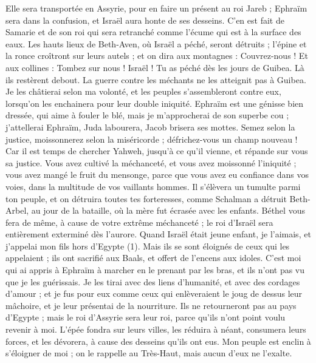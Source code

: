 \begin{multicols}{2}
Elle sera transportée en Assyrie, pour en faire un présent au roi Jareb ; Ephraïm sera dans la confusion, et Israël aura honte de ses desseins.
C’en est fait de Samarie et de son roi qui sera retranché comme l'écume qui est à la surface des eaux.
Les hauts lieux de Beth-Aven, où Israël a péché, seront détruits ; l'épine et la ronce croîtront sur leurs autels ; et on dira aux montagnes : Couvrez-nous ! Et aux collines : Tombez sur nous !
Israël ! Tu as péché dès les jours de Guibea. Là ils restèrent debout. La guerre contre les méchants ne les atteignit pas à Guibea.
Je les châtierai selon ma volonté, et les peuples s’assembleront contre eux, lorsqu’on les enchainera pour leur double iniquité.
Ephraïm est une génisse bien dressée, qui aime à fouler le blé, mais je m’approcherai de son superbe cou ; j’attellerai Ephraïm, Juda labourera, Jacob brisera ses mottes.
Semez selon la justice, moissonnerez selon la miséricorde ; défrichez-vous un champ nouveau ! Car il est temps de chercher Yahweh, jusqu'à ce qu'il vienne, et répande sur vous sa justice.
Vous avez cultivé la méchanceté, et vous avez moissonné l’iniquité ; vous avez mangé le fruit du mensonge, parce que vous avez eu confiance dans vos voies, dans la multitude de vos vaillants hommes.
Il s'élèvera un tumulte parmi ton peuple, et on détruira toutes tes forteresses, comme Schalman a détruit Beth-Arbel, au jour de la bataille, où la mère fut écrasée avec les enfants.
Béthel vous fera de même, à cause de votre extrême méchanceté ; le roi d'Israël sera entièrement exterminé dès l’aurore.
\VerseOne{}Quand Israël était jeune enfant, je l'aimais, et j'appelai mon fils hors d'Egypte (1).
Mais ils se sont éloignés de ceux qui les appelaient ; ils ont sacrifié aux Baals, et offert de l’encens aux idoles.
C’est moi qui ai appris à Ephraïm à marcher en le prenant par les bras, et ils n'ont pas vu que je les guérissais.
Je les tirai avec des liens d'humanité, et avec des cordages d'amour ; et je fus pour eux comme ceux qui enlèveraient le joug de dessus leur mâchoire, et je leur présentai de la nourriture.
Ils ne retourneront pas au pays d'Egypte ; mais le roi d'Assyrie sera leur roi, parce qu'ils n'ont point voulu revenir à moi.
L'épée fondra sur leurs villes, les réduira à néant, consumera leurs forces, et les dévorera, à cause des desseins qu’ils ont eus.
Mon peuple est enclin à s’éloigner de moi ; on le rappelle au Très-Haut, mais aucun d'eux ne l'exalte.

\end{multicols}
